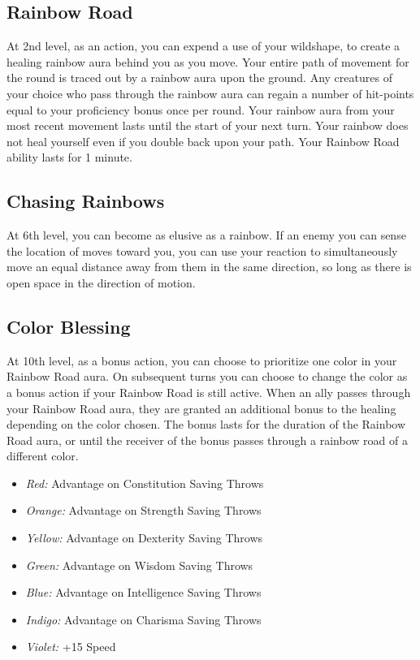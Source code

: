 \subsection{Rainbow Road}
At 2nd level, as an action, you can expend a use of your wildshape, to create a healing rainbow aura behind you as you move. Your entire path of movement for the round is traced out by a rainbow aura upon the ground. Any creatures of your choice who pass through the rainbow aura can regain a number of hit-points equal to your proficiency bonus once per round. Your rainbow aura from your most recent movement lasts until the start of your next turn. Your rainbow does not heal yourself even if you double back upon your path. Your Rainbow Road ability lasts for 1 minute.
\subsection{Chasing Rainbows}
At 6th level, you can become as elusive as a rainbow. If an enemy you can sense the location of moves toward you, you can use your reaction to simultaneously move an equal distance away from them in the same direction, so long as there is open space in the direction of motion.
\subsection{Color Blessing}
At 10th level, as a bonus action, you can choose to prioritize one color in your Rainbow Road aura. On subsequent turns you can choose to change the color as a bonus action if your Rainbow Road is still active. When an ally passes through your Rainbow Road aura, they are granted an additional bonus to the healing depending on the color chosen. The bonus lasts for the duration of the Rainbow Road aura, or until the receiver of the bonus passes through a rainbow road of a different color.
\begin{itemize}
    \item \textit{Red:} Advantage on Constitution Saving Throws
    \item \textit{Orange:} Advantage on Strength Saving Throws
    \item \textit{Yellow:} Advantage on Dexterity Saving Throws
    \item \textit{Green:} Advantage on Wisdom Saving Throws
    \item \textit{Blue:} Advantage on Intelligence Saving Throws
    \item \textit{Indigo:} Advantage on Charisma Saving Throws
    \item \textit{Violet:} +15 Speed
\end{itemize}
